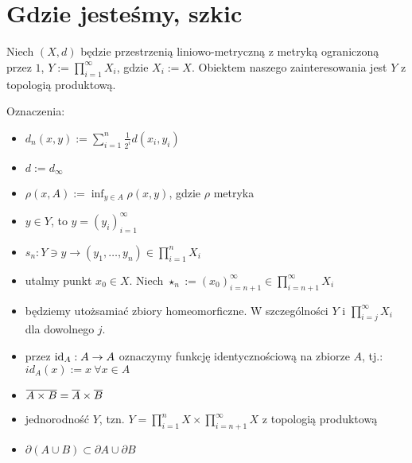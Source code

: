 \section{Gdzie jesteśmy, szkic}
Niech $(X, d)$ będzie przestrzenią liniowo-metryczną z metryką ograniczoną przez $1$, $Y := \prod_{i=1}^{\infty} X_i$, gdzie $X_i := X$. Obiektem naszego zainteresowania jest $Y$ z topologią produktową.

Oznaczenia:
\begin{itemize}
  \item $d_n(x, y) := \sum_{i=1}^n \frac{1}{2^i} d(x_i, y_i)$
  \item $d := d_\infty$
  \item $\rho(x, A) := \inf_{y \in A} \rho(x, y)$, gdzie $\rho$ metryka
  \item $y \in Y$, to $y = (y_i)_{i=1}^\infty$
  \item $s_n: Y \ni y \rightarrow (y_1, \ldots, y_n) \in \prod_{i=1}^{n} X_i$
  \item utalmy punkt $x_0 \in X$. Niech $\star_n := (x_0)_{i=n+1}^\infty \in \prod_{i=n+1}^\infty X_i$
  \item będziemy utożsamiać zbiory homeomorficzne. W szczególności $Y$ i $\prod_{i=j}^\infty X_i$ dla dowolnego $j$.
  \item przez $\mbox{id}_A: A \rightarrow A$ oznaczymy funkcję identycznościową na zbiorze $A$, tj.: $id_A(x) := x\ \forall x \in A$
\end{itemize}

\begin{note}
\begin{itemize}
  \item $\overline{A \times B} = \overline{A} \times \overline{B}$
  \item jednorodność $Y$, tzn. $Y = \prod_{i=1}^n X \times \prod_{i=n+1}^\infty X$ z topologią produktową
  \item $\partial(A \cup B) \subset \partial A \cup \partial B$
\end{itemize}
\end{note}

